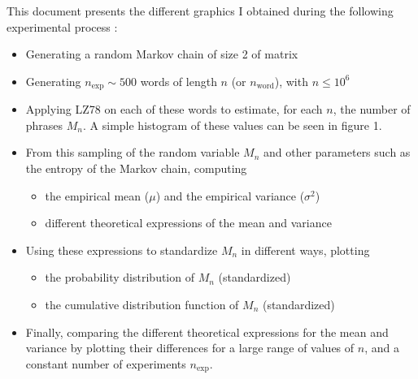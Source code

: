 

\separation
\bk







\medskip


This	 document presents the different graphics I obtained during the following experimental
process :
	
\begin{itemize}

	\item Generating a random Markov chain of size 2 of matrix
 \item
 Generating $n_{\text{exp}} \sim 500$ words of length $n $ (or $n_{\text{word}}$), with $n \leq 10^6$
 
 \item Applying LZ78 on each of these words to estimate, for each $n$,
 the number of phrases $M_n$. A simple histogram of these values
 can be seen in figure 1.
 
 \item From this sampling of the random variable $M_n$ and other parameters such as the entropy of the Markov chain, computing
 
 	\begin{itemize}
 		\item the empirical mean ($\mu$) and the empirical variance ($\sigma^2$)
 		\item different theoretical expressions of the mean and variance
 	\end{itemize}
 	
 \item Using these expressions to standardize $M_n$ in different ways, plotting
 
 	\begin{itemize}
 		\item the probability distribution of $M_n$ (standardized)
 			  
 		\item the cumulative distribution function of $M_n$ (standardized)
 	\end{itemize}
 
 \item Finally, comparing the different theoretical expressions for the mean and 
 variance by plotting their differences for a large range of values of $n$, and
 a constant number of experiments $n_{\text{exp}}$.
\end{itemize}
 
